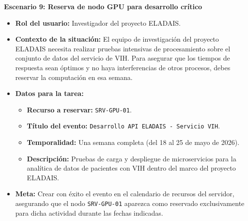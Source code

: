 \noindent\textbf{Escenario 9: Reserva de nodo GPU para desarrollo crítico}
\begin{itemize}
    \item \textbf{Rol del usuario:} Investigador del proyecto ELADAIS.
    \item \textbf{Contexto de la situación:} 
    El equipo de investigación del proyecto ELADAIS necesita realizar pruebas intensivas de procesamiento sobre el conjunto de datos del servicio de VIH. Para asegurar que los tiempos de respuesta sean óptimos y no haya interferencias de otros procesos, debes reservar la computación en esa semana.
    
    \item \textbf{Datos para la tarea:}
        \begin{itemize}
            \item \textbf{Recurso a reservar:} \texttt{SRV-GPU-01}.
            \item \textbf{Título del evento:} \texttt{Desarrollo API ELADAIS - Servicio VIH}.
            \item \textbf{Temporalidad:} Una semana completa (del 18 al 25 de mayo de 2026).
            \item \textbf{Descripción:} Pruebas de carga y despliegue de microservicios para la analítica de datos de pacientes con VIH dentro del marco del proyecto ELADAIS.
        \end{itemize}
    \item \textbf{Meta:} 
    Crear con éxito el evento en el calendario de recursos del servidor, asegurando que el nodo \texttt{SRV-GPU-01} aparezca como reservado exclusivamente para dicha actividad durante las fechas indicadas.
\end{itemize}


